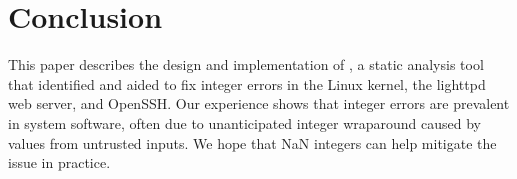 \section{Conclusion}
\label{s:concl}

This paper describes the design and implementation of \sys, a static
analysis tool that identified and aided to fix \nrbugs integer
errors in the Linux kernel, the lighttpd web server, and OpenSSH\@.
Our experience shows that integer errors are prevalent in system software,
often due to unanticipated integer wraparound caused by values from
untrusted inputs.  We hope that NaN integers can help mitigate the
issue in practice.
